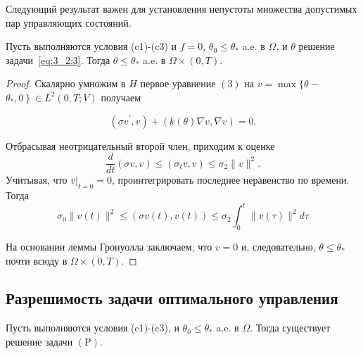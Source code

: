 Следующий результат важен для установления непустоты
множества допустимых пар управляющих состояний.

\begin{lemma}
    \label{lm:3_2:2}
    Пусть выполняются условия (c1)-(c3) и
    $f=0$, $\theta_{0} \leq \theta_{*}$ a.e. в $\Omega$,
    и $\theta$ решение задачи~\eqref{eq:3_2:3}.
    Тогда $\theta \leq \theta_{*}$ a.e. в $\Omega \times(0, T)$.
\end{lemma}

\begin{proof}
    Скалярно умножим в $H$ первое уравнение $(3)$ на
    $v=\max \{\theta-$ $\left.\theta_{*}, 0\right\} \in L^{2}(0, T ; V)$ получаем

    \[ \left(\sigma v^{\prime}, v\right)+(k(\theta) \nabla v, \nabla v)=0. \]

    Отбрасывая неотрицательный второй член, приходим к оценке
    \[ \frac{d}{d t}(\sigma v, v) \leq\left(\sigma_{t} v, v\right) \leq \sigma_{2}\|v\|^{2}. \]
    Учитывая, что $\left.v\right|_{t=0}=0$, проинтегрировать
    последнее неравенство по времени.
    Тогда
    \[ \sigma_{0}\|v(t)\|^{2} \leq(\sigma v(t), v(t)) \leq \sigma_{2} \int_{0}^{t}\|v(\tau)\|^{2} d \tau \]

    На основании леммы Гронуолла заключаем,
    что $v=0$ и, следовательно, $\theta \leq \theta_{*}$ почти всюду в $\Omega\times(0,T)$.
\end{proof}

\subsection{Разрешимость задачи оптимального управления}
\label{subsec:ch3:sec2:subsec5}

\begin{theorem}
    \label{th:3_2:1}
    Пусть выполняются условия (c1)-(c3), и $\theta_{0} \leq \theta_{*}$ a.e. в $\Omega$.
    Тогда существует решение задачи $(\mathrm{P})$.
\end{theorem}

